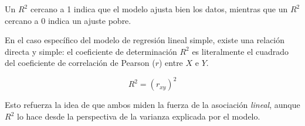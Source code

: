 \documentclass[
  letterpaper,
  DIV=11,
  numbers=noendperiod]{scrreprt}
\begin{document}
Un \(R^2\) cercano a 1 indica que el modelo ajusta bien los datos,
mientras que un \(R^2\) cercano a 0 indica un ajuste pobre.

\begin{tcolorbox}[enhanced jigsaw, breakable, toprule=.15mm, bottomtitle=1mm, coltitle=black, colbacktitle=quarto-callout-note-color!10!white, titlerule=0mm, opacitybacktitle=0.6, bottomrule=.15mm, toptitle=1mm, title=\textcolor{quarto-callout-note-color}{\faInfo}\hspace{0.5em}{Relación entre R² y el coeficiente de correlación}, arc=.35mm, rightrule=.15mm, opacityback=0, colframe=quarto-callout-note-color-frame, leftrule=.75mm, left=2mm, colback=white]

En el caso específico del modelo de regresión lineal simple, existe una
relación directa y simple: el coeficiente de determinación \(R^2\) es
literalmente el cuadrado del coeficiente de correlación de Pearson
(\(r\)) entre \(X\) e \(Y\).

\[ R^2 = (r_{xy})^2 \]

Esto refuerza la idea de que ambos miden la fuerza de la asociación
\emph{lineal}, aunque \(R^2\) lo hace desde la perspectiva de la
varianza explicada por el modelo.

\end{tcolorbox}
\end{document}
